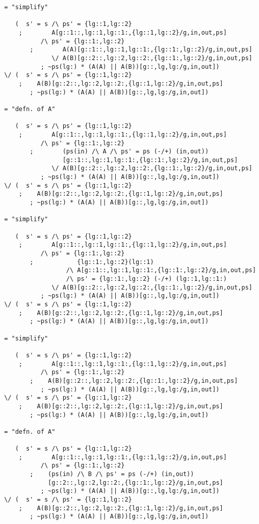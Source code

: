 \begin{verbatim}
 = "simplify"

    (  s' = s /\ ps' = {lg::1,lg::2}
     ;        A[g::1::,lg::1,lg::1:,{lg::1,lg::2}/g,in,out,ps]
           /\ ps' = {lg::1:,lg::2}
        ;        A(A)[g::1::,lg::1,lg::1:,{lg::1:,lg::2}/g,in,out,ps]
              \/ A(B)[g::2::,lg::2,lg::2:,{lg::1:,lg::2}/g,in,out,ps]
           ; ~ps(lg:) * (A(A) || A(B))[g::,lg,lg:/g,in,out])
 \/ (  s' = s /\ ps' = {lg::1,lg::2}
     ;    A(B)[g::2::,lg::2,lg::2:,{lg::1,lg::2}/g,in,out,ps]
        ; ~ps(lg:) * (A(A) || A(B))[g::,lg,lg:/g,in,out])

 = "defn. of A"

    (  s' = s /\ ps' = {lg::1,lg::2}
     ;        A[g::1::,lg::1,lg::1:,{lg::1,lg::2}/g,in,out,ps]
           /\ ps' = {lg::1:,lg::2}
        ;        (ps(in) /\ A /\ ps' = ps (-/+) (in,out))
                 [g::1::,lg::1,lg::1:,{lg::1:,lg::2}/g,in,out,ps]
              \/ A(B)[g::2::,lg::2,lg::2:,{lg::1:,lg::2}/g,in,out,ps]
           ; ~ps(lg:) * (A(A) || A(B))[g::,lg,lg:/g,in,out])
 \/ (  s' = s /\ ps' = {lg::1,lg::2}
     ;    A(B)[g::2::,lg::2,lg::2:,{lg::1,lg::2}/g,in,out,ps]
        ; ~ps(lg:) * (A(A) || A(B))[g::,lg,lg:/g,in,out])

 = "simplify"

    (  s' = s /\ ps' = {lg::1,lg::2}
     ;        A[g::1::,lg::1,lg::1:,{lg::1,lg::2}/g,in,out,ps]
           /\ ps' = {lg::1:,lg::2}
        ;            {lg::1:,lg::2}(lg::1)
                  /\ A[g::1::,lg::1,lg::1:,{lg::1:,lg::2}/g,in,out,ps]
                  /\ ps' = {lg::1:,lg::2} (-/+) (lg::1,lg::1:)
              \/ A(B)[g::2::,lg::2,lg::2:,{lg::1:,lg::2}/g,in,out,ps]
           ; ~ps(lg:) * (A(A) || A(B))[g::,lg,lg:/g,in,out])
 \/ (  s' = s /\ ps' = {lg::1,lg::2}
     ;    A(B)[g::2::,lg::2,lg::2:,{lg::1,lg::2}/g,in,out,ps]
        ; ~ps(lg:) * (A(A) || A(B))[g::,lg,lg:/g,in,out])

 = "simplify"

    (  s' = s /\ ps' = {lg::1,lg::2}
     ;        A[g::1::,lg::1,lg::1:,{lg::1,lg::2}/g,in,out,ps]
           /\ ps' = {lg::1:,lg::2}
        ;    A(B)[g::2::,lg::2,lg::2:,{lg::1:,lg::2}/g,in,out,ps]
           ; ~ps(lg:) * (A(A) || A(B))[g::,lg,lg:/g,in,out])
 \/ (  s' = s /\ ps' = {lg::1,lg::2}
     ;    A(B)[g::2::,lg::2,lg::2:,{lg::1,lg::2}/g,in,out,ps]
        ; ~ps(lg:) * (A(A) || A(B))[g::,lg,lg:/g,in,out])

 = "defn. of A"

    (  s' = s /\ ps' = {lg::1,lg::2}
     ;        A[g::1::,lg::1,lg::1:,{lg::1,lg::2}/g,in,out,ps]
           /\ ps' = {lg::1:,lg::2}
        ;    (ps(in) /\ B /\ ps' = ps (-/+) (in,out))
             [g::2::,lg::2,lg::2:,{lg::1:,lg::2}/g,in,out,ps]
           ; ~ps(lg:) * (A(A) || A(B))[g::,lg,lg:/g,in,out])
 \/ (  s' = s /\ ps' = {lg::1,lg::2}
     ;    A(B)[g::2::,lg::2,lg::2:,{lg::1,lg::2}/g,in,out,ps]
        ; ~ps(lg:) * (A(A) || A(B))[g::,lg,lg:/g,in,out])


\end{verbatim}
